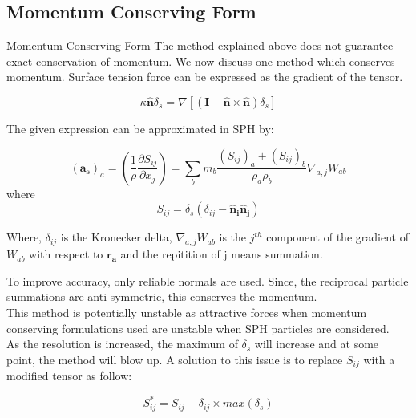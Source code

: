 \documentclass{beamer}
\begin{document}
\subsection{Momentum Conserving Form}
\begin{frame}{Momentum Conserving Form}
The method explained above does not guarantee exact conservation of momentum. 
We now discuss one method which conserves momentum. Surface tension force can be expressed as the gradient of the tensor.

\begin{equation*}
 \kappa \mathbf{\hat n} \delta_s = \nabla[(\mathbf{I} - \mathbf{\hat n}\times\mathbf{\hat n})\delta_s]
\end{equation*}

\noindent
The given expression can be approximated in SPH by:

\begin{equation*}
 (\mathbf{a_s})_a = \left( \frac{1}{\rho} \frac{\partial S_{ij}}{\partial x_j} \right) = \sum_b m_b \frac{(S_{ij})_a + (S_{ij})_b}{\rho_a \rho_b} \nabla_{a, j} W_{ab}
\end{equation*}
\noindent
where 
\begin{equation*}
 S_{ij} = \delta_s(\delta_{ij} - \mathbf{\hat n_i}\mathbf{\hat n_j})
\end{equation*}

\noindent
Where, $\delta_{ij}$ is the Kronecker delta, $\nabla_{a,j}W_{ab}$ is the $j^{th}$ component of the gradient of $W_{ab}$ with respect to $\mathbf{r_a}$ and the repitition of j means summation. 
\end{frame}

\begin{frame}
To improve accuracy, only reliable normals are used. Since, the reciprocal particle summations are anti-symmetric, this conserves the momentum.\\

This method is potentially unstable as attractive forces when momentum conserving formulations used are unstable when SPH particles are considered.\\
As the resolution is increased, the maximum of $\delta_s$ will increase and at some point, the method will blow up. 
A solution to this issue is to replace $S_{ij}$ with a modified tensor as follow:

\begin{equation*}
 S_{ij}^* = S_{ij} - \delta_{ij}\times max(\delta_s)
\end{equation*}
\end{frame}
\end{document}
